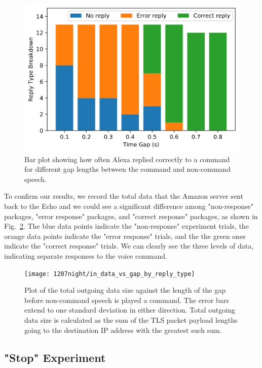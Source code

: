 \begin{figure}[!t]
	\centering
	\includegraphics[scale=0.4]{../measurement/results/1207night/reply_type_breakdown}
	\caption{Bar plot showing how often Alexa replied correctly to a command for different gap lengths between the command and non-command speech.}
	\label{fig:gap}
	\vspace{-3mm}
	\end{figure}

To confirm our results, we record the total data that the Amazon server sent back to the Echo and we could see a significant difference among "non-response" packages, "error response" packages, and "correct response" packages, as shown in Fig.~\ref{fig:postfix_variablegap_sizes}. The blue data points indicate the "non-response" experiment trials, the orange data points indicate the "error response" trials, and the the green ones indicate the "correct response" trials. We can clearly see the three levels of data, indicating separate responses to the voice command.

\begin{figure}[!t]
    \centering
    \texttt{[image: 1207night/in\_data\_vs\_gap\_by\_reply\_type]}
    \caption{Plot of the total outgoing data size against the length of the gap before non-command speech is played a command. The error bars extend to one standard deviation in either direction. Total outgoing data size is calculated as the sum of the TLS packet payload lengths going to the destination IP address with the greatest such sum.}
    \label{fig:postfix_variablegap_sizes}
\end{figure}


\subsection{"Stop" Experiment}


